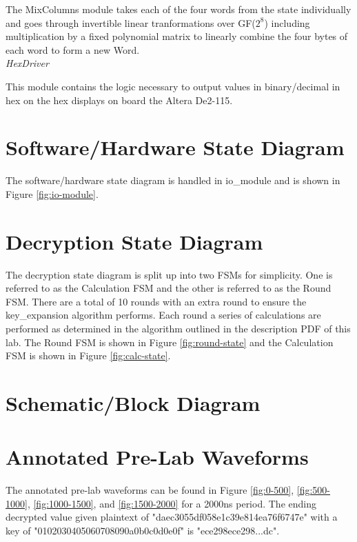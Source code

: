 \documentclass[journal, twocolumn, final,11pt,letterpaper]{IEEEtran}
\begin{document}
The MixColumns module takes each of the four words from the state individually and goes through invertible linear tranformations over GF($2^8$) including multiplication by a fixed polynomial matrix to linearly combine the four bytes of each word to form a new Word.\\

\textit{HexDriver}\\
\vspace{-4mm}

This module contains the logic necessary to output values in binary/decimal in hex on the hex displays on board the Altera De2-115.\\


\section{Software/Hardware State Diagram}
The software/hardware state diagram is handled in io\_module and is shown in Figure \ref{fig:io-module}.

\section{Decryption State Diagram}
The decryption state diagram is split up into two FSMs for simplicity. One is referred to as the Calculation FSM and the other is referred to as the Round FSM. There are a total of 10 rounds with an extra round to ensure the key\_expansion algorithm performs. Each round a series of calculations are performed as determined in the algorithm outlined in the description PDF of this lab. The Round FSM is shown in Figure \ref{fig:round-state} and the Calculation FSM is shown in Figure \ref{fig:calc-state}.

\section{Schematic/Block Diagram}

\section{Annotated Pre-Lab Waveforms}
The annotated pre-lab waveforms can be found in Figure \ref{fig:0-500}, \ref{fig:500-1000}, \ref{fig:1000-1500}, and \ref{fig:1500-2000} for a 2000ns period. The ending decrypted value given plaintext of "daec3055df058e1c39e814ea76f6747e" with a key of "0102030405060708090a0b0c0d0e0f" is "ece298ece298...dc".
\end{document}
